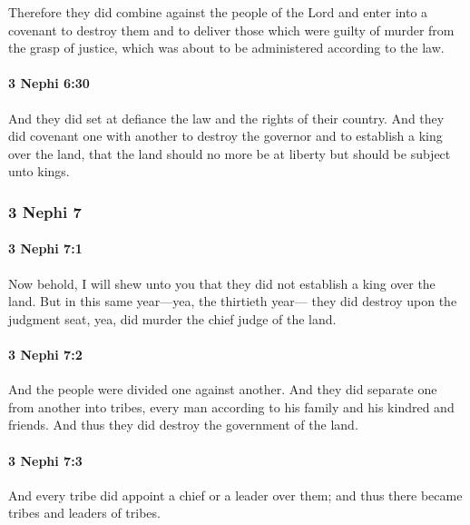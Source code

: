 			Therefore they did combine against the people of the Lord
			and enter into a covenant to destroy them
			and to deliver those which were guilty of murder from the grasp of justice,
			which was about to be administered according to the law.

		\paragraph{3 Nephi 6:30} %
			\label{3NEPHI-6-30}

			And they did set at defiance the law and the rights of their country.
			And they did covenant one with another to destroy the governor
			and to establish a king over the land,
			that the land should no more be at liberty but should be subject unto kings.

	\subsubsection{3 Nephi 7} %
		\label{3NEPHI-7}
		
		\paragraph{3 Nephi 7:1} %
			\label{3NEPHI-7-1}

			Now behold, I will shew unto you
			that they did not establish a king over the land.
			But in this same year---yea, the thirtieth year---
			they did destroy upon the judgment seat,
			yea, did murder the chief judge of the land.

		\paragraph{3 Nephi 7:2} %
			\label{3NEPHI-7-2}

			And the people were divided one against another.
			And they did separate one from another into tribes,
			every man according to his family and his kindred and friends.
			And thus they did destroy the government of the land.

		\paragraph{3 Nephi 7:3} %
			\label{3NEPHI-7-3}

			And every tribe did appoint a chief or a leader over them;
			and thus there became tribes and leaders of tribes.

